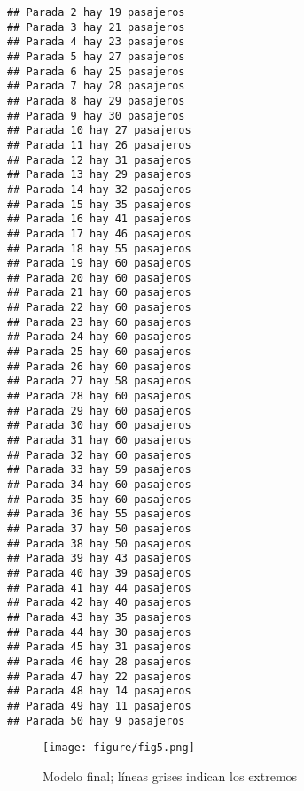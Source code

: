 \documentclass[]{article}
\makeatletter
\def\maxwidth{\ifdim\Gin@nat@width>\linewidth\linewidth
\else\Gin@nat@width\fi}
\let\Oldincludegraphics\includegraphics
\renewcommand{\includegraphics}[1]{\Oldincludegraphics[width=\maxwidth]{#1}}
\makeatother
\begin{document}
\begin{verbatim}
## Parada 2 hay 19 pasajeros
## Parada 3 hay 21 pasajeros
## Parada 4 hay 23 pasajeros
## Parada 5 hay 27 pasajeros
## Parada 6 hay 25 pasajeros
## Parada 7 hay 28 pasajeros
## Parada 8 hay 29 pasajeros
## Parada 9 hay 30 pasajeros
## Parada 10 hay 27 pasajeros
## Parada 11 hay 26 pasajeros
## Parada 12 hay 31 pasajeros
## Parada 13 hay 29 pasajeros
## Parada 14 hay 32 pasajeros
## Parada 15 hay 35 pasajeros
## Parada 16 hay 41 pasajeros
## Parada 17 hay 46 pasajeros
## Parada 18 hay 55 pasajeros
## Parada 19 hay 60 pasajeros
## Parada 20 hay 60 pasajeros
## Parada 21 hay 60 pasajeros
## Parada 22 hay 60 pasajeros
## Parada 23 hay 60 pasajeros
## Parada 24 hay 60 pasajeros
## Parada 25 hay 60 pasajeros
## Parada 26 hay 60 pasajeros
## Parada 27 hay 58 pasajeros
## Parada 28 hay 60 pasajeros
## Parada 29 hay 60 pasajeros
## Parada 30 hay 60 pasajeros
## Parada 31 hay 60 pasajeros
## Parada 32 hay 60 pasajeros
## Parada 33 hay 59 pasajeros
## Parada 34 hay 60 pasajeros
## Parada 35 hay 60 pasajeros
## Parada 36 hay 55 pasajeros
## Parada 37 hay 50 pasajeros
## Parada 38 hay 50 pasajeros
## Parada 39 hay 43 pasajeros
## Parada 40 hay 39 pasajeros
## Parada 41 hay 44 pasajeros
## Parada 42 hay 40 pasajeros
## Parada 43 hay 35 pasajeros
## Parada 44 hay 30 pasajeros
## Parada 45 hay 31 pasajeros
## Parada 46 hay 28 pasajeros
## Parada 47 hay 22 pasajeros
## Parada 48 hay 14 pasajeros
## Parada 49 hay 11 pasajeros
## Parada 50 hay 9 pasajeros
\end{verbatim}
\begin{figure}[htbp]
\centering
\texttt{[image: figure/fig5.png]}
\caption{Modelo final; líneas grises indican los extremos}
\end{figure}
\end{document}
